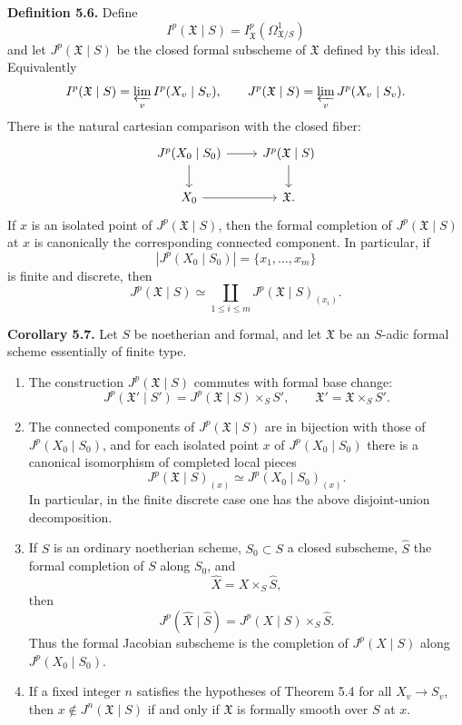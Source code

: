 \documentclass[11pt]{article}
\begin{document}
\textbf{Definition 5.6.}  Define
\[
        I^p(\mathfrak X\mid S)=I^p_{\mathfrak X}(\Omega^1_{\mathfrak X/S})
\]
and let \(J^p(\mathfrak X\mid S)\) be the closed formal subscheme of \(\mathfrak X\) defined by this ideal.  Equivalently
\[
        I^p(\mathfrak X\mid S)=\varprojlim_v I^p(X_v\mid S_v),
        \qquad
        J^p(\mathfrak X\mid S)=\varprojlim_v J^p(X_v\mid S_v).
\]
There is the natural cartesian comparison with the closed fiber:
\[
\begin{tikzcd}
J^p(X_0\mid S_0) \arrow[r] \arrow[d] &
J^p(\mathfrak X\mid S) \arrow[d]\\
X_0 \arrow[r] & \mathfrak X .
\end{tikzcd}
\]
If \(x\) is an isolated point of \(J^p(\mathfrak X\mid S)\), then the formal completion of \(J^p(\mathfrak X\mid S)\) at \(x\) is canonically the corresponding connected component.  In particular, if
\[
        |J^p(X_0\mid S_0)|=\{x_1,\ldots,x_m\}
\]
is finite and discrete, then
\[
        J^p(\mathfrak X\mid S)
        \simeq
        \coprod_{1\leq i\leq m} J^p(\mathfrak X\mid S)_{(x_i)}.
\]

\textbf{Corollary 5.7.}  Let \(S\) be noetherian and formal, and let \(\mathfrak X\) be an \(S\)-adic formal scheme essentially of finite type.
\begin{enumerate}[label=(\arabic*)]
\item The construction \(J^p(\mathfrak X\mid S)\) commutes with formal base change:
\[
        J^p(\mathfrak X'\mid S')=
        J^p(\mathfrak X\mid S)\times_S S',
        \qquad \mathfrak X'=\mathfrak X\times_S S'.
\]
\item The connected components of \(J^p(\mathfrak X\mid S)\) are in bijection with those of \(J^p(X_0\mid S_0)\), and for each isolated point \(x\) of \(J^p(X_0\mid S_0)\) there is a canonical isomorphism of completed local pieces
\[
        J^p(\mathfrak X\mid S)_{(x)}
        \simeq
        J^p(X_0\mid S_0)_{(x)} .
\]
In particular, in the finite discrete case one has the above disjoint-union decomposition.
\item If \(S\) is an ordinary noetherian scheme, \(S_0\subset S\) a closed subscheme, \(\widehat S\) the formal completion of \(S\) along \(S_0\), and
\[
        \widehat X=X\times_S\widehat S,
\]
then
\[
        J^p(\widehat X\mid \widehat S)
        =
        J^p(X\mid S)\times_S \widehat S.
\]
Thus the formal Jacobian subscheme is the completion of \(J^p(X\mid S)\) along \(J^p(X_0\mid S_0)\).
\item If a fixed integer \(n\) satisfies the hypotheses of Theorem 5.4 for all \(X_v\to S_v\), then \(x\notin J^n(\mathfrak X\mid S)\) if and only if \(\mathfrak X\) is formally smooth over \(S\) at \(x\).
\end{enumerate}
\end{document}
